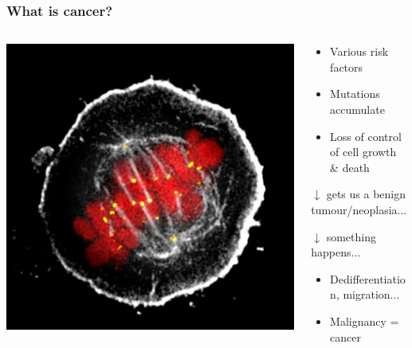 \documentclass{beamer}
\begin{document}
\begin{frame}
    \frametitle{What is cancer?}
    \begin{columns}
        \begin{column}{0.5\textwidth}
        \includegraphics[width=\textwidth]{figures/HeLaCell_wellcometrust.jpg}
        \end{column}
        \begin{column}{0.5\textwidth}
            \begin{itemize}
            \item Various risk factors
            \item Mutations accumulate
            \item Loss of control of cell growth \& death
            \end{itemize}
            \begin{center}
            $\downarrow$ gets us a benign tumour/neoplasia...
            \end{center}
            \begin{center}
            $\downarrow$ something happens...
            \end{center}
            \begin{itemize}
            \item Dedifferentiation, migration...
            \item Malignancy = cancer
            \end{itemize}
        \end{column}
    \end{columns}
    \;
    \begin{center}
    \vphantom{$\sum$}
    \end{center}

\end{frame}
\end{document}
